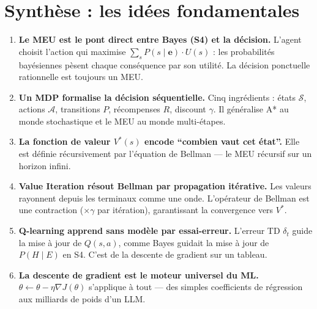 \documentclass[11pt,a4paper]{article}
\begin{document}
\section{Synthèse : les idées fondamentales}

\begin{retenirbox}
\begin{enumerate}
    \item \textbf{Le MEU est le pont direct entre Bayes (S4) et la décision.} L'agent choisit l'action qui maximise $\sum_s P(s \mid \mathbf{e}) \cdot U(s)$ : les probabilités bayésiennes pèsent chaque conséquence par son utilité. La décision ponctuelle rationnelle est toujours un MEU.

    \item \textbf{Un MDP formalise la décision séquentielle.} Cinq ingrédients : états $\mathcal{S}$, actions $\mathcal{A}$, transitions $P$, récompenses $R$, discount $\gamma$. Il généralise A* au monde stochastique et le MEU au monde multi-étapes.

    \item \textbf{La fonction de valeur $V^*(s)$ encode ``combien vaut cet état''.} Elle est définie récursivement par l'équation de Bellman --- le MEU récursif sur un horizon infini.

    \item \textbf{Value Iteration résout Bellman par propagation itérative.} Les valeurs rayonnent depuis les terminaux comme une onde. L'opérateur de Bellman est une contraction ($\times\gamma$ par itération), garantissant la convergence vers $V^*$.

    \item \textbf{Q-learning apprend sans modèle par essai-erreur.} L'erreur TD $\delta_t$ guide la mise à jour de $Q(s,a)$, comme Bayes guidait la mise à jour de $P(H \mid E)$ en S4. C'est de la descente de gradient sur un tableau.

    \item \textbf{La descente de gradient est le moteur universel du ML.} $\theta \leftarrow \theta - \eta \nabla J(\theta)$ s'applique à tout --- des simples coefficients de régression aux milliards de poids d'un LLM.
\end{enumerate}
\end{retenirbox}
\end{document}
